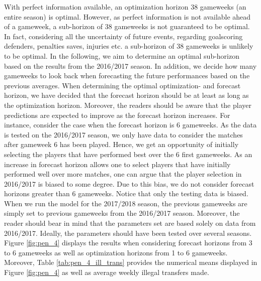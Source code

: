 With perfect information available, an optimization horizon 38 gameweeks (an entire season) is optimal. However, as perfect information is not available ahead of a gameweek, a sub-horizon of 38 gameweeks is not guaranteed to be optimal. In fact, considering all the uncertainty of future events, regarding goalscoring defenders, penalties saves, injuries etc. a sub-horizon of 38 gameweeks is unlikely to be optimal. In the following, we aim to determine an optimal sub-horizon based on the results from the 2016/2017 season. In addition, we decide how many gameweeks to look back when forecasting the future performances based on the previous averages.
\newpar
When determining the optimal optimization- and forecast horizon, we have decided that the forecast horizon should be at least as long as the optimization horizon. Moreover, the readers should be aware that the player predictions are expected to improve as the forecast horizon increases. For instance, consider the case when the forecast horizon is 6 gameweeks. As the data is tested on the 2016/2017 season, we only have data to consider the matches after gameweek 6 has been played. Hence, we get an opportunity of initially selecting the players that have performed best over the 6 first gameweeks. As an increase in forecast horizon allows one to select players that have initially performed well over more matches, one can argue that the player selection in 2016/2017 is biased to some degree. Due to this bias, we do not consider forecast horizons greater than 6 gameweeks. 
\newpar
Notice that only the testing data is biased. When we run the model for the 2017/2018 season, the previous gameweeks are simply set to previous gameweeks from the 2016/2017 season. Moreover, the reader should bear in mind that the parameters set are based solely on data from 2016/2017. Ideally, the parameters should have been tested over several seasons. 
\newpar
Figure \ref{fig:pen_4} displays the results when considering forecast horizons from 3 to 6 gameweeks as well as optimization horizons from 1 to 6 gameweeks.  Moreover, Table \ref{tab:pen_4_ill_trans} provides the numerical means displayed in Figure \ref{fig:pen_4} as well as average weekly illegal transfers made. 

